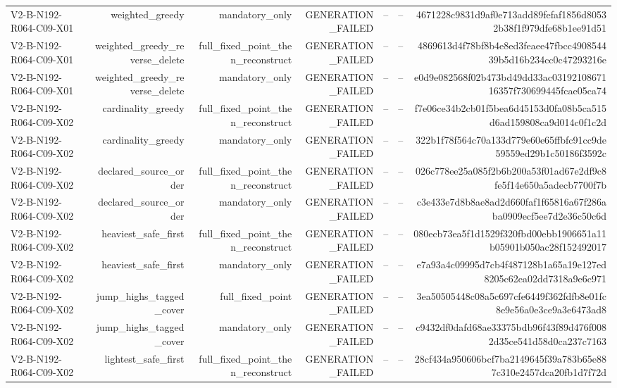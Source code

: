 {\begin{longtable}{lrrrrrr}
V2-B-N192-R064-C09-X01 & weighted\_greedy & mandatory\_only & GENERATION\_FAILED & -- & -- & 4671228c9831d9af0e713add89fefaf1856d80532b38f1f979dfe68b1ee91d51 \\
V2-B-N192-R064-C09-X01 & weighted\_greedy\_reverse\_delete & full\_fixed\_point\_then\_reconstruct & GENERATION\_FAILED & -- & -- & 4869613d4f78bf8b4e8ed3feaee47fbcc490854439b5d16b234cc0c47293216e \\
V2-B-N192-R064-C09-X01 & weighted\_greedy\_reverse\_delete & mandatory\_only & GENERATION\_FAILED & -- & -- & e0d9e082568f02b473bd49dd33ac0319210867116357f730699445fcae05ca74 \\
V2-B-N192-R064-C09-X02 & cardinality\_greedy & full\_fixed\_point\_then\_reconstruct & GENERATION\_FAILED & -- & -- & f7e06ce34b2cb01f5bea6d45153d0fa08b5ca515d6ad159808ca9d014c0f1c2d \\
V2-B-N192-R064-C09-X02 & cardinality\_greedy & mandatory\_only & GENERATION\_FAILED & -- & -- & 322b1f78f564c70a133d779e60e65ffbfc91cc9de59559ed29b1c50186f3592c \\
V2-B-N192-R064-C09-X02 & declared\_source\_order & full\_fixed\_point\_then\_reconstruct & GENERATION\_FAILED & -- & -- & 026c778ee25a085f2b6b200a53f01ad67e2df9c8fe5f14e650a5adecb7700f7b \\
V2-B-N192-R064-C09-X02 & declared\_source\_order & mandatory\_only & GENERATION\_FAILED & -- & -- & c3e433e7d8b8ae8ad2d660faf1f65816a67f286aba0909ecf5ee7d2e36c50c6d \\
V2-B-N192-R064-C09-X02 & heaviest\_safe\_first & full\_fixed\_point\_then\_reconstruct & GENERATION\_FAILED & -- & -- & 080ecb73ea5f1d1529f320fbd00ebb1906651a11b05901b050ac28f152492017 \\
V2-B-N192-R064-C09-X02 & heaviest\_safe\_first & mandatory\_only & GENERATION\_FAILED & -- & -- & e7a93a4c09995d7cb4f487128b1a65a19e127ed8205c62ea02dd7318a9e6c971 \\
V2-B-N192-R064-C09-X02 & jump\_highs\_tagged\_cover & full\_fixed\_point & GENERATION\_FAILED & -- & -- & 3ea50505448c08a5c697cfe6449f362fdfb8e01fc8e9e56a0e3ce9a3e6473ad8 \\
V2-B-N192-R064-C09-X02 & jump\_highs\_tagged\_cover & mandatory\_only & GENERATION\_FAILED & -- & -- & c9432df0dafd68ae33375bdb96f43f89d476f0082d35ce541d58d0ca237c7163 \\
V2-B-N192-R064-C09-X02 & lightest\_safe\_first & full\_fixed\_point\_then\_reconstruct & GENERATION\_FAILED & -- & -- & 28cf434a950606bcf7ba2149645f39a783b65e887c310e2457dca20fb1d7f72d \\

\end{longtable}}
